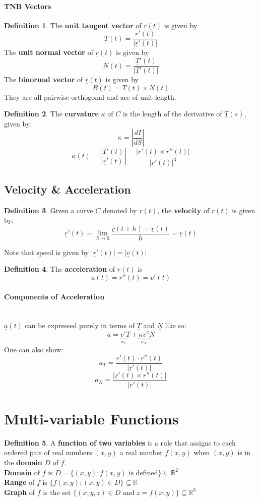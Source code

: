 \documentclass[12 pt]{article}
\theoremstyle{definition}
\newtheorem{defn}{Definition}
\begin{document}
\paragraph*{TNB Vectors}
\begin{defn}
	The \textbf{unit tangent vector} of $\underline{r}(t)$ is given by $$\underline{T}(t)=\frac{\underline{r}'(t)}{|\underline{r}'(t)|}$$
	The \textbf{unit normal vector} of $\underline{r}(t)$ is given by $$\underline{N}(t)=\frac{\underline{T}'(t)}{|\underline{T}'(t)|}$$
	The \textbf{binormal vector} of $\underline{r}(t)$ is given by $$\underline{B}(t)=\underline{T}(t)\times \underline{N}(t)$$
	They are all pairwise orthogonal and are of unit length.
\end{defn}
\begin{defn}
	The \textbf{curvature} $\kappa$ of $C$ is the length of the derivative of $\underline{T}(s)$, given by: $$\kappa =\left|\frac{dI}{dS}\right|$$
	$$\kappa (t)=\left|\frac{\underline{T}'(t)}{\underline{r}'(t)}\right|=\frac{|\underline{r}'(t)\times \underline{r}''(t)|}{|\underline{r}'(t)|^3}$$
\end{defn}
\subsection{Velocity \& Acceleration}
\begin{defn}
	Given a curve $C$ denoted by $\underline{r}(t)$, the \textbf{velocity} of $\underline{r}(t)$ is given by: $$\underline{r}'(t)=\lim_{h\to 0} \frac{\underline{r}(t+h)-\underline{r}(t)}{h}=\underline{v}(t)$$
\end{defn}
Note that speed is given by $|\underline{r}'(t)|=|\underline{v}(t)|$
\begin{defn}
	The \textbf{acceleration} of $\underline{r}(t)$ is $$\underline{a}(t)=\underline{r}''(t)=\underline{v}'(t)$$
\end{defn}
\paragraph{Components of Acceleration}~
\\ $\underline{a}(t)$ can be expressed purely in terms of $\underline{T}$ and $\underline{N}$ like so: $$\underline{a}=\underbrace{v'}_{a_T}\underline{T}+\underbrace{\kappa v^2}_{a_N} \underline{N}$$
One can also show: 
$$a_T=\frac{\underline{r}'(t)\cdot \underline{r}''(t)}{|\underline{r}'(t)|}$$
$$a_N=\frac{|\underline{r}'(t)\times r''(t)|}{|\underline{r}'(t)|}$$
\section{Multi-variable Functions}
\begin{defn}
	A \textbf{function of two variables} is a rule that assigns to each ordered pair of real numbers $(x,y)$ a real number $f(x,y)$ when $(x,y)$ is in the \textbf{domain} $D$ of $f$.
	\\\textbf{Domain} of $f$ is $D=\{(x,y):f(x,y)\text{ is defined}\}\subseteq\mathbb{R}^2$
	\\\textbf{Range} of $f$ is $\{f(x,y):(x,y)\in D\}\subseteq \mathbb{R}$
	\\\textbf{Graph} of $f$ is the set $\{(x,y,z)\in D \text{ and }z=f(x,y)\}\subseteq \mathbb{R}^3$
\end{defn}
\end{document}
